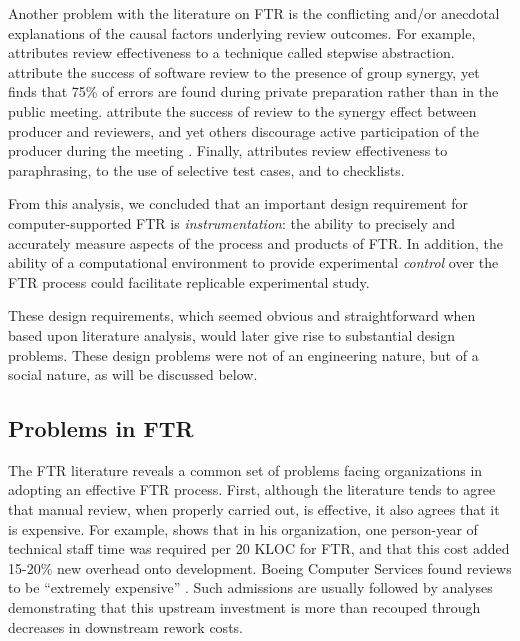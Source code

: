 Another problem with the literature on FTR is the conflicting and/or
anecdotal explanations of the causal factors underlying review outcomes.
For example, \cite{Selby85} attributes review effectiveness to a technique
called stepwise abstraction.  \cite{Dunn90,Peele82} attribute the success
of software review to the presence of group synergy, yet \cite{Humphrey90}
finds that 75\% of errors are found during private preparation rather than
in the public meeting.  \cite{Myers78,Parnas85,Peele82} attribute the
success of review to the synergy effect between producer and reviewers, and
yet others discourage active participation of the producer during the
meeting \cite{Ackerman89,Russell91,Pfleeger91}.  Finally, \cite{Fagan76}
attributes review effectiveness to paraphrasing, \cite{Ackerman89} to the
use of selective test cases, and \cite{Knight91} to checklists.

From this analysis, we concluded that an important design requirement for
computer-supported FTR is {\em instrumentation}: the ability to precisely
and accurately measure aspects of the process and products of FTR.  In
addition, the ability of a computational environment to provide
experimental {\em control} over the FTR process could facilitate replicable
experimental study.

These design requirements, which seemed obvious and straightforward when
based upon literature analysis, would later give rise to substantial design
problems.  These design problems were not of an engineering nature, but of
a social nature, as will be discussed below.
 

\subsection{Problems in FTR}
\label{sec:issues-manual-review}

The FTR literature reveals a common set of problems facing organizations in
adopting an effective FTR process.  First, although the literature tends to
agree that manual review, when properly carried out, is effective, it also
agrees that it is expensive.  For example, \cite{Russell91} shows that in
his organization, one person-year of technical staff time was required per
20 KLOC for FTR, and that this cost added 15-20\% new overhead onto
development. Boeing Computer Services found reviews to be ``extremely
expensive'' \cite{Glass82}. Such admissions are usually followed by
analyses demonstrating that this upstream investment is more than recouped
through decreases in downstream rework costs.

